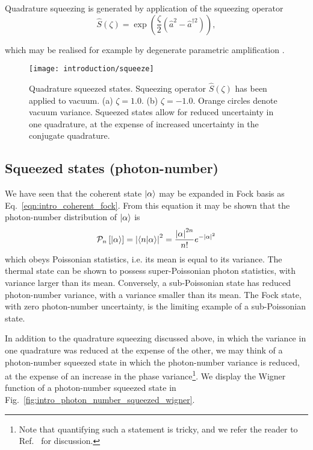 Quadrature squeezing is generated by application of the squeezing operator
\begin{equation}
\hat{S}\left(\zeta\right) = \exp \left(\frac{\zeta}{2} \left(\hat{a}^2 - \hat{a}^{\dagger 2}\right) \right),
\end{equation}

\noindent which may be realised for example by degenerate parametric amplification \cite{Boyd2008}.

\begin{figure}[htp]
\captionsetup{width=0.8\linewidth}
\centering
\texttt{[image: introduction/squeeze]}
\caption{\label{fig:intro_quadrature_squeezed_wigner} Quadrature squeezed states. Squeezing operator $\hat{S}\left(\zeta\right)$ has been applied to vacuum. (a) $\zeta = 1.0$. (b) $\zeta = -1.0$. Orange circles denote vacuum variance. Squeezed states allow for reduced uncertainty in one quadrature, at the expense of increased uncertainty in the conjugate quadrature.}
\end{figure}

\FloatBarrier
\subsection{Squeezed states (photon-number)}
We have seen that the coherent state $\ket{\alpha}$ may be expanded in Fock basis as Eq.~\ref{eqn:intro_coherent_fock}. From this equation it may be shown that the photon-number distribution of $\ket{\alpha}$ is 
\begin{equation}
\mathcal{P}_n\left[\ket{\alpha}\right] = \left| \ip{n}{\alpha} \right|^2 = \frac{\left|\alpha\right|^{2n}}{n!} e^{-\left|\alpha\right|^2}
\end{equation}
which obeys Poissonian statistics, i.e. its mean is equal to its variance. The thermal state can be shown to possess super-Poissonian photon statistics, with variance larger than its  mean. Conversely, a sub-Poissonian state has reduced photon-number variance, with a variance smaller than its mean. The Fock state, with zero photon-number uncertainty, is the limiting example of a sub-Poissonian state.

In addition to the quadrature squeezing discussed above, in which the variance in one quadrature was reduced at the expense of the other, we may think of a photon-number squeezed state in which the photon-number variance is reduced, at the expense of an increase in the phase variance\footnote{Note that quantifying such a statement is tricky, and we refer the reader to Ref.~\cite{Barnett_red_book} for discussion.}. We display the Wigner function of a photon-number squeezed state in Fig.~\ref{fig:intro_photon_number_squeezed_wigner}.

